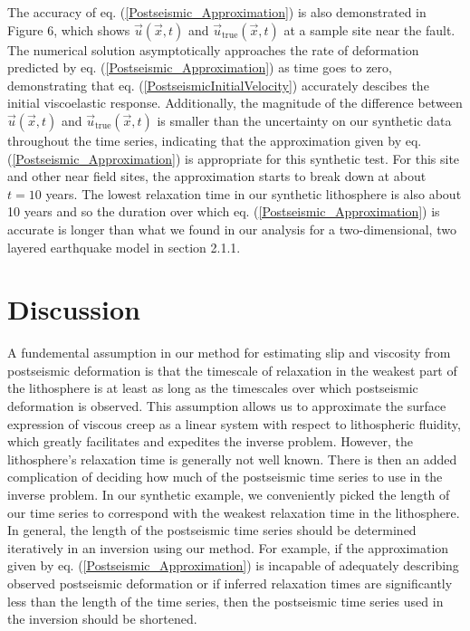 \documentclass[extra,mreferee]{gji}
\begin{document}
The accuracy of eq. (\ref{Postseismic_Approximation}) is also
demonstrated in Figure 6, which shows $\vec{u}(\vec{x},t)$ and
$\vec{u}_{\mathrm{true}}(\vec{x},t)$ at a sample site near the fault.
The numerical solution asymptotically approaches the rate of
deformation predicted by eq. (\ref{Postseismic_Approximation}) as time
goes to zero, demonstrating that
eq. (\ref{PostseismicInitialVelocity}) accurately descibes the initial
viscoelastic response.  Additionally, the magnitude of the difference
between $\vec{u}(\vec{x},t)$ and $\vec{u}_{\mathrm{true}}(\vec{x},t)$
is smaller than the uncertainty on our synthetic data throughout the
time series, indicating that the approximation given by
eq. (\ref{Postseismic_Approximation}) is appropriate for this
synthetic test.  For this site and other near field sites, the
approximation starts to break down at about $t=10$ years. The lowest
relaxation time in our synthetic lithosphere is also about 10 years
and so the duration over which eq. (\ref{Postseismic_Approximation})
is accurate is longer than what we found in our analysis for a
two-dimensional, two layered earthquake model in section 2.1.1. 

\section{Discussion}

A fundemental assumption in our method for estimating slip and
viscosity from postseismic deformation is that the timescale of
relaxation in the weakest part of the lithosphere is at least as long
as the timescales over which postseismic deformation is observed.
This assumption allows us to approximate the surface expression of
viscous creep as a linear system with respect to lithospheric
fluidity, which greatly facilitates and expedites the inverse problem.
However, the lithosphere's relaxation time is generally not well
known.  There is then an added complication of deciding how much of
the postseismic time series to use in the inverse problem.  In our
synthetic example, we conveniently picked the length of our time
series to correspond with the weakest relaxation time in the
lithosphere. In general, the length of the postseismic time series
should be determined iteratively in an inversion using our method.
For example, if the approximation given by
eq. (\ref{Postseismic_Approximation}) is incapable of adequately
describing observed postseismic deformation or if inferred relaxation
times are significantly less than the length of the time series, then
the postseismic time series used in the inversion should be shortened.
\end{document}
